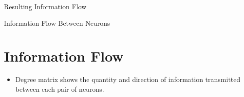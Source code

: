 \documentclass{beamer}
\begin{document}
\begin{frame}{Resulting Information Flow}
\begin{figure}
\begin{minipage}{0.45\linewidth}
\end{minipage}
\end{figure}

\end{frame}




\begin{frame}{Information Flow Between Neurons}

\section{Information Flow}
%
%


\begin{itemize}

\vfill \item Degree matrix shows the quantity and direction of information transmitted between each pair of neurons.





\end{itemize}
\end{frame}
\end{document}
